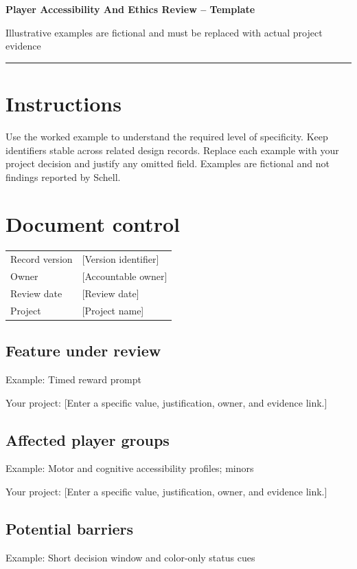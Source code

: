 \documentclass[11pt]{article}
\begin{document}
{\huge\bfseries\color{suiteblue} Player Accessibility And Ethics Review -- Template}\par
\vspace{0.15in}
{\normalsize\color{suitegray} Illustrative examples are fictional and must be replaced with actual project evidence}\par
\vspace{0.15in}\hrule\vspace{0.15in}

\section{Instructions}
Use the worked example to understand the required level of specificity. Keep identifiers stable across related design records. Replace each example with your project decision and justify any omitted field. Examples are fictional and not findings reported by Schell.


\section{Document control}
\begin{tabularx}{\linewidth}{@{}lX@{}}\toprule Record version & [Version identifier]\\ Owner & [Accountable owner]\\ Review date & [Review date]\\ Project & [Project name]\\\bottomrule\end{tabularx}

\subsection{Feature under review}
Example: Timed reward prompt

Your project: [Enter a specific value, justification, owner, and evidence link.]


\subsection{Affected player groups}
Example: Motor and cognitive accessibility profiles; minors

Your project: [Enter a specific value, justification, owner, and evidence link.]


\subsection{Potential barriers}
Example: Short decision window and color-only status cues
\end{document}
